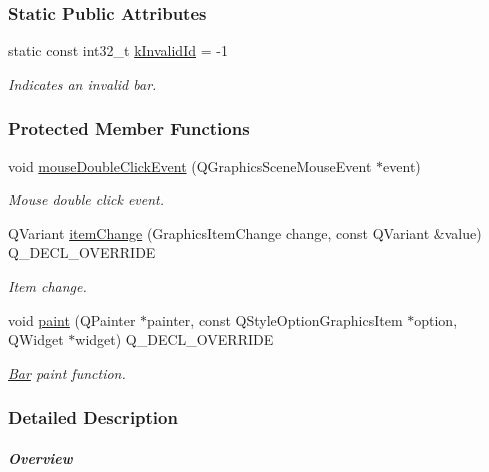 \subsubsection*{Static Public Attributes}
\begin{DoxyCompactItemize}
\item 
static const int32\+\_\+t \hyperlink{group___models_ga9919592c0397ed41448dfb20b607d738}{k\+Invalid\+Id} = -\/1
\begin{DoxyCompactList}\small\item\em Indicates an invalid bar. \end{DoxyCompactList}\end{DoxyCompactItemize}
\subsubsection*{Protected Member Functions}
\begin{DoxyCompactItemize}
\item 
void \hyperlink{group___models_ga1945e7b4401fa9ad7475274d9fb12a72}{mouse\+Double\+Click\+Event} (Q\+Graphics\+Scene\+Mouse\+Event $\ast$event)
\begin{DoxyCompactList}\small\item\em Mouse double click event. \end{DoxyCompactList}\item 
Q\+Variant \hyperlink{group___models_gad97a82d618ee0c51a9a36e44339c69e6}{item\+Change} (Graphics\+Item\+Change change, const Q\+Variant \&value) Q\+\_\+\+D\+E\+C\+L\+\_\+\+O\+V\+E\+R\+R\+I\+D\+E
\begin{DoxyCompactList}\small\item\em Item change. \end{DoxyCompactList}\item 
void \hyperlink{group___models_gacbb6dbac607412c9c1f9dfcd0cd4d432}{paint} (Q\+Painter $\ast$painter, const Q\+Style\+Option\+Graphics\+Item $\ast$option, Q\+Widget $\ast$widget) Q\+\_\+\+D\+E\+C\+L\+\_\+\+O\+V\+E\+R\+R\+I\+D\+E
\begin{DoxyCompactList}\small\item\em \hyperlink{class_bar}{Bar} paint function. \end{DoxyCompactList}\end{DoxyCompactItemize}


\subsubsection{Detailed Description}
\subparagraph*{Overview}

